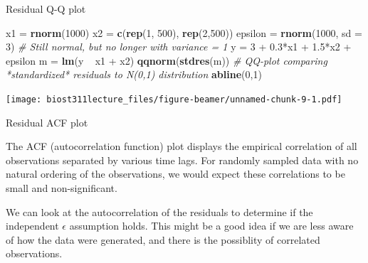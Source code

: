 \documentclass[12pt,ignorenonframetext,]{beamer}
\newenvironment{Shaded}{\begin{snugshade}}{\end{snugshade}}
\newcommand{\KeywordTok}[1]{\textcolor[rgb]{0.13,0.29,0.53}{\textbf{{#1}}}}
\newcommand{\DataTypeTok}[1]{\textcolor[rgb]{0.13,0.29,0.53}{{#1}}}
\newcommand{\DecValTok}[1]{\textcolor[rgb]{0.00,0.00,0.81}{{#1}}}
\newcommand{\FloatTok}[1]{\textcolor[rgb]{0.00,0.00,0.81}{{#1}}}
\newcommand{\StringTok}[1]{\textcolor[rgb]{0.31,0.60,0.02}{{#1}}}
\newcommand{\CommentTok}[1]{\textcolor[rgb]{0.56,0.35,0.01}{\textit{{#1}}}}
\newcommand{\NormalTok}[1]{{#1}}
\begin{document}
\begin{frame}[fragile]{Residual Q-Q plot}

\tiny

\begin{Shaded}
\begin{Highlighting}[]
\NormalTok{x1 =}\StringTok{ }\KeywordTok{rnorm}\NormalTok{(}\DecValTok{1000}\NormalTok{)}
\NormalTok{x2 =}\StringTok{ }\KeywordTok{c}\NormalTok{(}\KeywordTok{rep}\NormalTok{(}\DecValTok{1}\NormalTok{, }\DecValTok{500}\NormalTok{), }\KeywordTok{rep}\NormalTok{(}\DecValTok{2}\NormalTok{,}\DecValTok{500}\NormalTok{))}
\NormalTok{epsilon =}\StringTok{ }\KeywordTok{rnorm}\NormalTok{(}\DecValTok{1000}\NormalTok{, }\DataTypeTok{sd =} \DecValTok{3}\NormalTok{) }\CommentTok{# Still normal, but no longer with variance = 1}
\NormalTok{y =}\StringTok{ }\DecValTok{3} \NormalTok{+}\StringTok{ }\FloatTok{0.3}\NormalTok{*x1 +}\StringTok{ }\FloatTok{1.5}\NormalTok{*x2 +}\StringTok{ }\NormalTok{epsilon}
\NormalTok{m =}\StringTok{ }\KeywordTok{lm}\NormalTok{(y ~}\StringTok{ }\NormalTok{x1 +}\StringTok{ }\NormalTok{x2)}
\KeywordTok{qqnorm}\NormalTok{(}\KeywordTok{stdres}\NormalTok{(m)) }\CommentTok{# QQ-plot comparing *standardized* residuals to N(0,1) distribution}
\KeywordTok{abline}\NormalTok{(}\DecValTok{0}\NormalTok{,}\DecValTok{1}\NormalTok{)}
\end{Highlighting}
\end{Shaded}

\texttt{[image: biost311lecture\_files/figure-beamer/unnamed-chunk-9-1.pdf]}

\normalsize

\end{frame}

\begin{frame}{Residual ACF plot}

The ACF (autocorrelation function) plot displays the empirical
correlation of all observations separated by various time lags. For
randomly sampled data with no natural ordering of the observations, we
would expect these correlations to be small and non-significant.

We can look at the autocorrelation of the residuals to determine if the
independent \(\epsilon\) assumption holds. This might be a good idea if
we are less aware of how the data were generated, and there is the
possiblity of correlated observations.

\end{frame}
\end{document}
